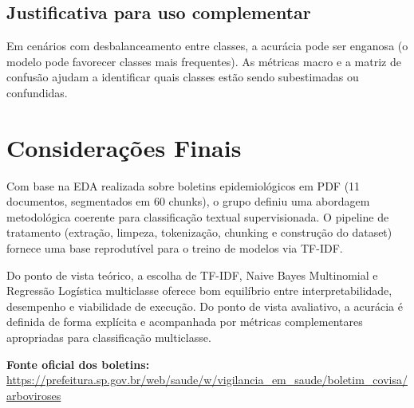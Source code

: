 \documentclass[12pt,a4paper]{article}
\begin{document}
\subsection{Justificativa para uso complementar}

Em cenários com desbalanceamento entre classes, a acurácia pode ser enganosa (o modelo pode favorecer classes mais frequentes). As métricas macro e a matriz de confusão ajudam a identificar quais classes estão sendo subestimadas ou confundidas.

\clearpage
\section{Considerações Finais}

Com base na EDA realizada sobre boletins epidemiológicos em PDF (11 documentos, segmentados em 60 chunks), o grupo definiu uma abordagem metodológica coerente para classificação textual supervisionada. O pipeline de tratamento (extração, limpeza, tokenização, chunking e construção do dataset) fornece uma base reprodutível para o treino de modelos via TF-IDF.

Do ponto de vista teórico, a escolha de TF-IDF, Naive Bayes Multinomial e Regressão Logística multiclasse oferece bom equilíbrio entre interpretabilidade, desempenho e viabilidade de execução. Do ponto de vista avaliativo, a acurácia é definida de forma explícita e acompanhada por métricas complementares apropriadas para classificação multiclasse.

\vspace{0.3cm}
\noindent
\textbf{Fonte oficial dos boletins:} \\
\url{https://prefeitura.sp.gov.br/web/saude/w/vigilancia_em_saude/boletim_covisa/arboviroses}
\end{document}
